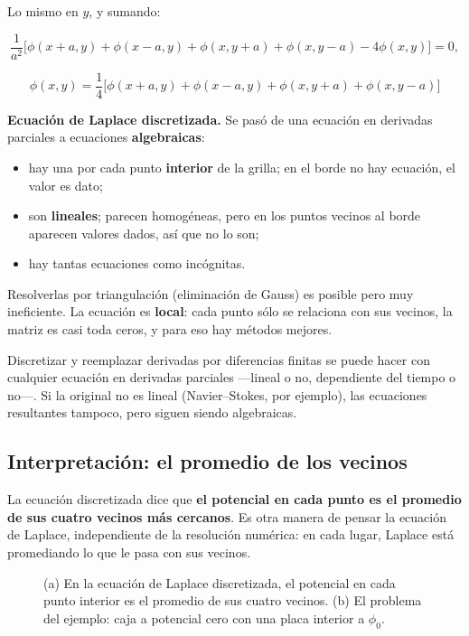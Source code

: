 \documentclass[12pt,a4paper]{article}
\begin{document}
Lo mismo en $y$, y sumando:

\[
\frac{1}{a^2}\Big[\phi(x+a,y)+\phi(x-a,y)+\phi(x,y+a)+\phi(x,y-a)-4\phi(x,y)\Big] = 0,
\]

\begin{keybox}
\[
\boxed{\ \phi(x,y) = \frac14\Big[\phi(x+a,y)+\phi(x-a,y)+\phi(x,y+a)+\phi(x,y-a)\Big]\ }
\]
\end{keybox}

\textbf{Ecuación de Laplace discretizada.} Se pasó de una ecuación en derivadas
parciales a ecuaciones \textbf{algebraicas}:

\begin{itemize}
  \item hay una por cada punto \textbf{interior} de la grilla; en el borde no hay
  ecuación, el valor es dato;
  \item son \textbf{lineales}; parecen homogéneas, pero en los puntos vecinos al borde
  aparecen valores dados, así que no lo son;
  \item hay tantas ecuaciones como incógnitas.
\end{itemize}

Resolverlas por triangulación (eliminación de Gauss) es posible pero muy
ineficiente. La ecuación es \textbf{local}: cada punto sólo se relaciona con sus
vecinos, la matriz es casi toda ceros, y para eso hay métodos mejores.

\begin{notebox}
Discretizar y reemplazar derivadas por
diferencias finitas se puede hacer con cualquier ecuación en derivadas
parciales ---lineal o no, dependiente del tiempo o no---. Si la original no es
lineal (Navier--Stokes, por ejemplo), las ecuaciones resultantes tampoco,
pero siguen siendo algebraicas.
\end{notebox}

\subsection{Interpretación: el promedio de los vecinos}

La ecuación discretizada dice que \textbf{el potencial en cada punto es el promedio
de sus cuatro vecinos más cercanos}. Es otra manera de pensar la ecuación de
Laplace, independiente de la resolución numérica: en cada lugar, Laplace está
promediando lo que le pasa con sus vecinos.

\begin{figure}[H]
  \centering
  
  \caption{(a) En la ecuación de Laplace discretizada, el potencial en cada punto interior es el promedio de sus cuatro vecinos. (b) El problema del ejemplo: caja a potencial cero con una placa interior a $\phi_0$.}
\end{figure}
\end{document}
